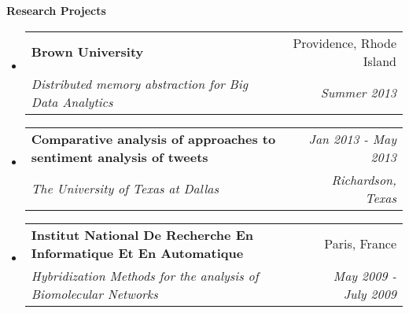 \documentclass[letterpaper,11pt]{article}
\makeatletter
\newcommand{\resitem}[1]{\item[\ding{226}] #1 \vspace{-2pt}}
\newcommand{\resheading}[1]{{\large \colorbox{mygrey}{\begin{minipage}{\textwidth}{\textbf{#1 \vphantom{p\^{E}}}}\end{minipage}}}}
\newcommand{\ressubheading}[4]{
\begin{tabular*}{7.0in}{l@{\extracolsep{\fill}}r}
		\textbf{#1} & #2 \\
		\textit{#3} & \textit{#4} \\
\end{tabular*}\vspace{-6pt}}
\newcommand{\reslineheading}[2]{
\begin{tabular*}{7.0in}{l@{\extracolsep{\fill}}r}
		\textbf{#1} & #2 \\
\end{tabular*}\vspace{-6pt}}
\makeatother
\begin{document}
\resheading{Research Projects}
\begin{itemize}

\item
	\ressubheading{Brown University}{Providence, Rhode Island}{Distributed memory abstraction for Big Data Analytics}{Summer 2013}

\item
	\ressubheading{Comparative analysis of approaches to sentiment analysis of tweets}{\textit{Jan 2013 - May 2013}}{The University of Texas at Dallas}{Richardson, Texas}

\item
	\ressubheading{Institut National De Recherche En Informatique Et En Automatique}{Paris, France}{Hybridization Methods for the analysis of Biomolecular Networks}{May 2009 - July 2009}
%

\end{itemize}
\end{document}
